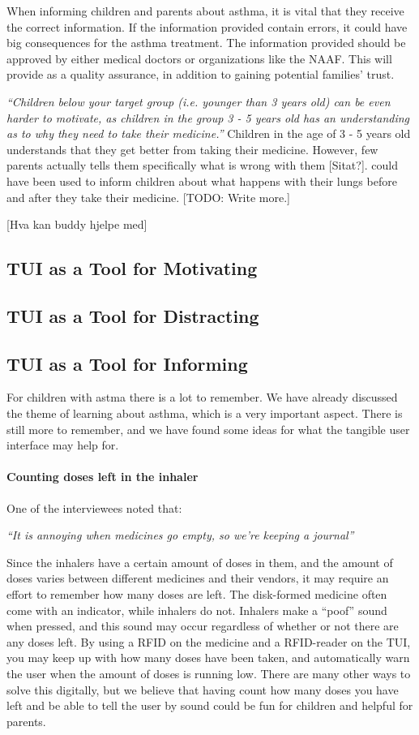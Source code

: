 When informing children and parents about asthma, it is vital that they receive the correct information. If the information provided contain errors, it could have big consequences for the asthma treatment. The information provided should be approved by either medical doctors or organizations like the NAAF. This will provide as a quality assurance, in addition to gaining potential families' trust.    

\textit{``Children below your target group (i.e. younger than 3 years old) can be even harder to motivate, as children in the group 3 - 5 years old has an understanding as to why they need to take their medicine.''}
Children in the age of 3 - 5 years old understands that they get better from taking their medicine. However, few parents actually tells them specifically what is wrong with them [Sitat?]. \buddy{} could have been used to inform children about what happens with their lungs before and after they take their medicine. 
[TODO: Write more.] 

[Hva kan buddy hjelpe med]

\subsection{TUI as a Tool for Motivating}


\subsection{TUI as a Tool for Distracting} 


\subsection{TUI as a Tool for Informing}
For children with astma there is a lot to remember. We have already discussed the theme of learning about asthma, which is a very important aspect. There is still more to remember, and we have found some ideas for what the tangible user interface may help for. 

\paragraph{Counting doses left in the inhaler}
One of the interviewees noted that: 

\textit{``It is annoying when medicines go empty, so we're keeping a journal''}

Since the inhalers have a certain amount of doses in them, and the amount of doses varies between different medicines and their vendors, it may require an effort to remember how many doses are left. The disk-formed medicine often come with an indicator, while inhalers do not. Inhalers make a ``poof'' sound when pressed, and this sound may occur regardless of whether or not there are any doses left. By using a RFID on the medicine and a RFID-reader on the TUI, you may keep up with how many doses have been taken, and automatically warn the user when the amount of doses is running low. There are many other ways to solve this digitally, but we believe that having \buddy{} count how many doses you have left and be able to tell the user by sound could be fun for children and helpful for parents.

